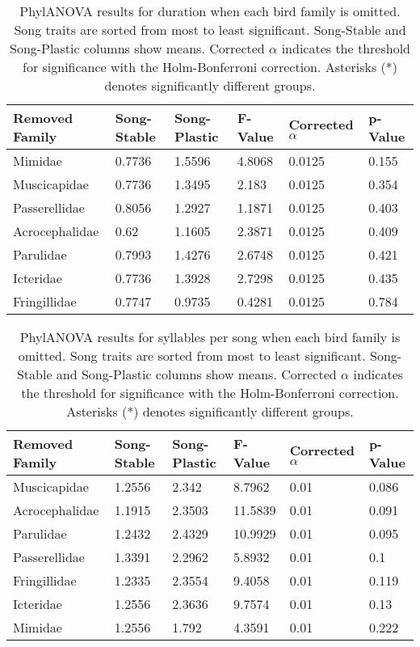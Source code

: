 \documentclass[a4paper,12pt]{article}
\begin{document}
\begin{table}[ht]
\centering
\caption{PhylANOVA results for duration when each bird family is omitted. Song traits are sorted from most to least significant. Song-Stable and Song-Plastic columns show means. Corrected $\alpha$ indicates the threshold for significance with the Holm-Bonferroni correction. Asterisks (*) denotes significantly different groups.}
\begin{tabular}{llllll}
  \hline
Removed Family & Song-Stable & Song-Plastic & F-Value & Corrected $\alpha$ & p-Value \\ 
  \hline
Mimidae & 0.7736 & 1.5596 & 4.8068 & 0.0125 & 0.155 \\ 
  Muscicapidae & 0.7736 & 1.3495 & 2.183 & 0.0125 & 0.354 \\ 
  Passerellidae & 0.8056 & 1.2927 & 1.1871 & 0.0125 & 0.403 \\ 
  Acrocephalidae & 0.62 & 1.1605 & 2.3871 & 0.0125 & 0.409 \\ 
  Parulidae & 0.7993 & 1.4276 & 2.6748 & 0.0125 & 0.421 \\ 
  Icteridae & 0.7736 & 1.3928 & 2.7298 & 0.0125 & 0.435 \\ 
  Fringillidae & 0.7747 & 0.9735 & 0.4281 & 0.0125 & 0.784 \\ 
   \hline
\end{tabular}
\end{table}

\begin{table}[ht]
\caption{PhylANOVA results for syllables per song when each bird family is omitted. Song traits are sorted from most to least significant. Song-Stable and Song-Plastic columns show means. Corrected $\alpha$ indicates the threshold for significance with the Holm-Bonferroni correction. Asterisks (*) denotes significantly different groups.}
\centering
\begin{tabular}{llllll}
  \hline
Removed Family & Song-Stable & Song-Plastic & F-Value & Corrected $\alpha$ & p-Value \\ 
  \hline
Muscicapidae & 1.2556 & 2.342 & 8.7962 & 0.01 & 0.086 \\ 
  Acrocephalidae & 1.1915 & 2.3503 & 11.5839 & 0.01 & 0.091 \\ 
  Parulidae & 1.2432 & 2.4329 & 10.9929 & 0.01 & 0.095 \\ 
  Passerellidae & 1.3391 & 2.2962 & 5.8932 & 0.01 & 0.1 \\ 
  Fringillidae & 1.2335 & 2.3554 & 9.4058 & 0.01 & 0.119 \\ 
  Icteridae & 1.2556 & 2.3636 & 9.7574 & 0.01 & 0.13 \\ 
  Mimidae & 1.2556 & 1.792 & 4.3591 & 0.01 & 0.222 \\ 
   \hline
\end{tabular}
\end{table}
\end{document}
